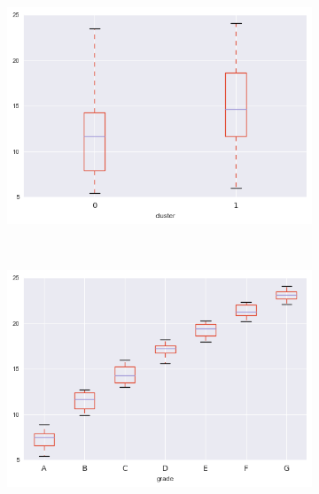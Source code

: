 \begin{apendicesenv}
\begin{figure}[t!]
\begin{subfigure}[t]{0.5\textwidth}
			\centerline{\includegraphics[width=1.05\textwidth]{img/int_rate_float_by_cluster}}
    	\end{subfigure}%
    	~ 
    	\begin{subfigure}[t]{0.5\textwidth}
    		\centering
   
			\centerline{\includegraphics[width=1.05\textwidth]{img/int_rate_float_by_grade}}

    	\end{subfigure}
\end{figure}



\begin{figure}[t!]
    \centering
        \caption{annual\textunderscore inc }
    	\begin{subfigure}[t]{0.5\textwidth}
    		\centering


\end{subfigure}
\end{figure}
\end{apendicesenv}
